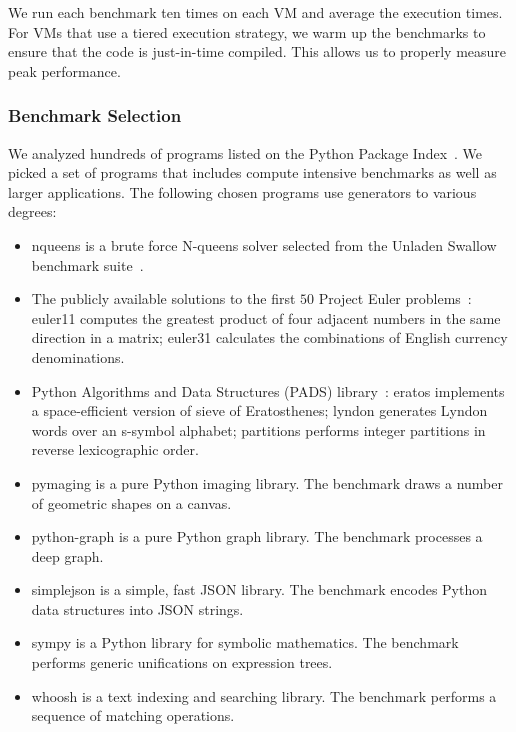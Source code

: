We run each benchmark ten times on each VM and average the execution times.
For VMs that use a tiered execution strategy, we warm up the benchmarks to ensure that the code is just-in-time compiled.
This allows us to properly measure peak performance.

\subsubsection*{Benchmark Selection}

We analyzed hundreds of programs listed on the Python Package Index~\cite{pypi}.
We picked a set of programs that includes compute intensive benchmarks as well as larger applications.
The following chosen programs use generators to various degrees:

\begin{itemize}

\item \textsf{nqueens} is a brute force N-queens solver selected from the Unladen Swallow benchmark suite~\cite{unladen.swallow}.

\item The publicly available solutions to the first $50$ Project Euler problems~\cite{projecteuler}:
\textsf{euler11} computes the greatest product of four adjacent numbers in the same direction in a matrix;
\textsf{euler31} calculates the combinations of English currency denominations.

\item Python Algorithms and Data Structures (PADS) library~\cite{pads}:
\textsf{eratos} implements a space-efficient version of sieve of Eratosthenes;
\textsf{lyndon} generates Lyndon words over an s-symbol alphabet;
\textsf{partitions} performs integer partitions in reverse lexicographic order.

\item \textsf{pymaging} is a pure Python imaging library.
The benchmark draws a number of geometric shapes on a canvas.

\item \textsf{python-graph} is a pure Python graph library.
The benchmark processes a deep graph.

\item \textsf{simplejson} is a simple, fast JSON library.
The benchmark encodes Python data structures into JSON strings.

\item \textsf{sympy} is a Python library for symbolic mathematics.
The benchmark performs generic unifications on expression trees.

\item \textsf{whoosh} is a text indexing and searching library.
The benchmark performs a sequence of matching operations.

\end{itemize}

